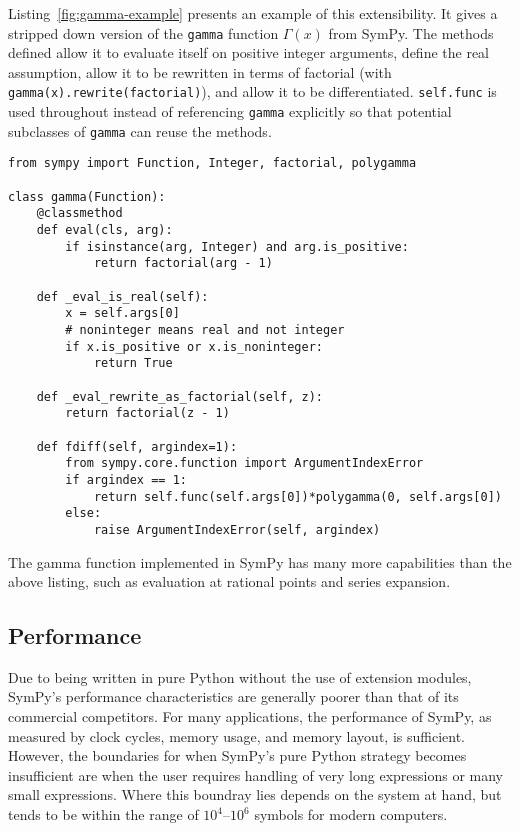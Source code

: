 Listing~\ref{fig:gamma-example} presents an example of this extensibility. It
gives a stripped down version of the \texttt{gamma} function $\Gamma(x)$ from
SymPy. The methods defined allow it to evaluate itself on positive integer
arguments, define the real assumption, allow it to be rewritten in terms of
factorial (with \verb|gamma(x).rewrite(factorial)|), and allow it to be
differentiated. \texttt{self.func} is used throughout instead of referencing
\texttt{gamma} explicitly so that potential subclasses of \texttt{gamma} can
reuse the methods.

\lstset{
  basicstyle=\ttfamily,
}

\begin{lstlisting}[caption={A minimal implementation of \texttt{sympy.gamma}.},label=fig:gamma-example]
from sympy import Function, Integer, factorial, polygamma

class gamma(Function):
    @classmethod
    def eval(cls, arg):
        if isinstance(arg, Integer) and arg.is_positive:
            return factorial(arg - 1)

    def _eval_is_real(self):
        x = self.args[0]
        # noninteger means real and not integer
        if x.is_positive or x.is_noninteger:
            return True

    def _eval_rewrite_as_factorial(self, z):
        return factorial(z - 1)

    def fdiff(self, argindex=1):
        from sympy.core.function import ArgumentIndexError
        if argindex == 1:
            return self.func(self.args[0])*polygamma(0, self.args[0])
        else:
            raise ArgumentIndexError(self, argindex)
\end{lstlisting}
The gamma function implemented in SymPy has many more capabilities than the
above listing, such as evaluation at rational points and series expansion.


\subsection{Performance}
\label{sec:performance}

Due to being written in pure Python without the use of extension modules,
SymPy's performance characteristics are generally poorer than that of
its commercial competitors. For many applications,
the performance of SymPy, as measured by clock cycles, memory usage, and memory
layout, is sufficient.
However, the boundaries for when SymPy's pure Python strategy becomes
insufficient are when the user requires handling of very long expressions or many
small expressions. Where this boundray lies depends on the system at hand, but tends
to be within the range of $10^4$--$10^6$ symbols for modern computers.

